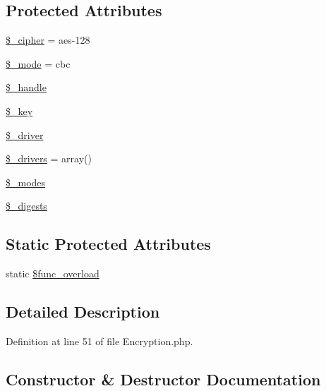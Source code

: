 \subsection*{Protected Attributes}
\begin{DoxyCompactItemize}
\item 
\mbox{\hyperlink{class_c_i___encryption_a4e0ebc185eac8850eed1270574032c20}{\$\+\_\+cipher}} = \textquotesingle{}aes-\/128\textquotesingle{}
\item 
\mbox{\hyperlink{class_c_i___encryption_a591b2fac857402b7049ebb2ca47cdd34}{\$\+\_\+mode}} = \textquotesingle{}cbc\textquotesingle{}
\item 
\mbox{\hyperlink{class_c_i___encryption_a8a6371c0c0a9ffce88717aa263edebc7}{\$\+\_\+handle}}
\item 
\mbox{\hyperlink{class_c_i___encryption_a535630cefaf93746423d63a93daa1099}{\$\+\_\+key}}
\item 
\mbox{\hyperlink{class_c_i___encryption_a538d24348271772aa61f8239cc6431dd}{\$\+\_\+driver}}
\item 
\mbox{\hyperlink{class_c_i___encryption_a3734ce50add95d0d78ea9fff6c4ad856}{\$\+\_\+drivers}} = array()
\item 
\mbox{\hyperlink{class_c_i___encryption_abb65eeb1f25e268d87c4736add738492}{\$\+\_\+modes}}
\item 
\mbox{\hyperlink{class_c_i___encryption_a5f70786f3b0ed3eef6c19f433102ca66}{\$\+\_\+digests}}
\end{DoxyCompactItemize}
\subsection*{Static Protected Attributes}
\begin{DoxyCompactItemize}
\item 
static \mbox{\hyperlink{class_c_i___encryption_aef84be58d58a5895572c5689e56a1047}{\$func\+\_\+overload}}
\end{DoxyCompactItemize}


\subsection{Detailed Description}


Definition at line 51 of file Encryption.\+php.



\subsection{Constructor \& Destructor Documentation}
\mbox{\label{class_c_i___encryption_a85ac5b7f54ad67ec6b5b9dc282717602}} 
